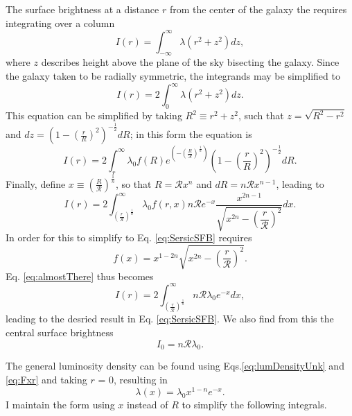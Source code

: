 \documentclass{article}
\begin{document}
The surface brightness at a distance $r$ from the center of the galaxy the requires integrating over a column
\begin{equation} I(r) = \int_{-\infty}^{\infty} \lambda(r^2 + z^2) dz, \end{equation}
where $z$ describes height above the plane of the sky bisecting the galaxy. Since the galaxy taken to be radially symmetric, the integrands may be simplified to 
\begin{equation} I(r) = 2\int_{0}^{\infty} \lambda(r^2 + z^2) dz. \end{equation}
This equation can be simplified by taking $R^2 \equiv r^2 + z^2$, such that $z = \sqrt{R^2 - r^2}$ and $dz = \left(1 - \left(\frac{r}{R}\right)^2\right)^{-\frac{1}{2}}dR$; in this form the equation is
\begin{equation} \label{eq:Rform} I(r) = 2\int_{r}^{\infty} \lambda_0  f(R) e^{\left(-\left(\frac{R}{\mathcal{R}}\right)^{\frac{1}{n}}\right)}\left(1 - \left(\frac{r}{R}\right)^2\right)^{-\frac{1}{2}}dR. \end{equation}
Finally, define $x \equiv \left(\frac{R}{\mathcal{R}}\right)^{\frac{1}{n}}$, so that $R = \mathcal{R}x^n$ and $dR = n\mathcal{R}x^{n-1}$, leading to
\begin{equation}\label{eq:almostThere} I(r) = 2\int_{\left(\frac{r}{\mathcal{R}}\right)^{\frac{1}{n}}}^{\infty} \lambda_0 f(r,x) n \mathcal{R} e^{-x} \frac{x^{2n - 1}}{\sqrt{x^{2n} - \left(\dfrac{r}{\mathcal{R}}\right)^2}} dx. \end{equation}
In order for this to simplify to Eq. \ref{eq:SersicSFB} requires 
\begin{equation} \label{eq:Fxr} f(x) = x^{1 - 2n}\sqrt{x^{2n} - \left(\dfrac{r}{\mathcal{R}}\right)^2}.\end{equation}
 Eq. \ref{eq:almostThere} thus becomes
\begin{equation} I(r) = 2\int_{\left(\frac{r}{\mathcal{R}}\right)^{\frac{1}{n}}}^{\infty} n \mathcal{R} \lambda_0 e^{-x} dx,  \end{equation}
leading to the desried result in Eq. \ref{eq:SersicSFB}. We also find from this the central surface brightness
\begin{equation} I_0 = n \mathcal{R} \lambda_0. \end{equation}


The general luminosity density can be found using Eqs.\ref{eq:lumDensityUnk} and \ref{eq:Fxr} and taking $r$ = 0, resulting in
\begin{equation} \label{eq:lumDensityX} \lambda(x) = \lambda_0 x^{1 - n} e^{-x}. \end{equation}
I maintain the form using $x$ instead of $R$ to simplify the following integrals.
\end{document}
